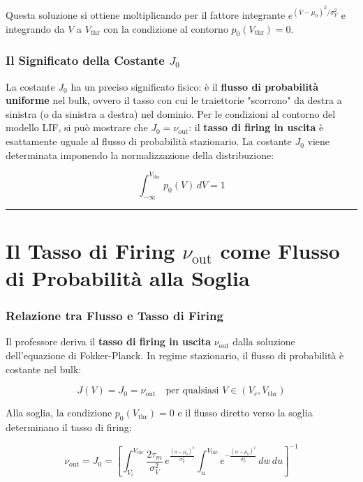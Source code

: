 Questa soluzione si ottiene moltiplicando per il fattore integrante $e^{(V-\mu_0)^2/\sigma_V^2}$ e integrando da $V$ a $V_{\text{thr}}$ con la condizione al contorno $p_0(V_{\text{thr}}) = 0$.

\subsubsection{Il Significato della Costante $J_0$}

La costante $J_0$ ha un preciso significato fisico: è il \textbf{flusso di probabilità uniforme} nel bulk, ovvero il tasso con cui le traiettorie "scorrono" da destra a sinistra (o da sinistra a destra) nel dominio. Per le condizioni al contorno del modello LIF, si può mostrare che $J_0 = \nu_{\text{out}}$: il \textbf{tasso di firing in uscita} è esattamente uguale al flusso di probabilità stazionario. La costante $J_0$ viene determinata imponendo la normalizzazione della distribuzione:

\begin{equation}
\int_{-\infty}^{V_{\text{thr}}} p_0(V)\, dV = 1
\end{equation}

\vspace{0.5cm}
\noindent\rule{\textwidth}{0.4pt}
\vspace{0.5cm}

\section{Il Tasso di Firing $\nu_{\text{out}}$ come Flusso di Probabilità alla Soglia}

\subsubsection{Relazione tra Flusso e Tasso di Firing}

Il professore deriva il \textbf{tasso di firing in uscita} $\nu_{\text{out}}$ dalla soluzione dell'equazione di Fokker-Planck. In regime stazionario, il flusso di probabilità è costante nel bulk:

\begin{equation}
J(V) = J_0 = \nu_{\text{out}} \quad \text{per qualsiasi } V \in (V_r, V_{\text{thr}})
\end{equation}

Alla soglia, la condizione $p_0(V_{\text{thr}}) = 0$ e il flusso diretto verso la soglia determinano il tasso di firing:

\begin{equation}
\nu_{\text{out}} = J_0 = \left[\int_{V_r}^{V_{\text{thr}}} \frac{2\tau_m}{\sigma_V^2}\, e^{\frac{(u - \mu_0)^2}{\sigma_V^2}} \int_{u}^{V_{\text{thr}}} e^{-\frac{(w - \mu_0)^2}{\sigma_V^2}}\, dw\, du\right]^{-1}
\end{equation}

